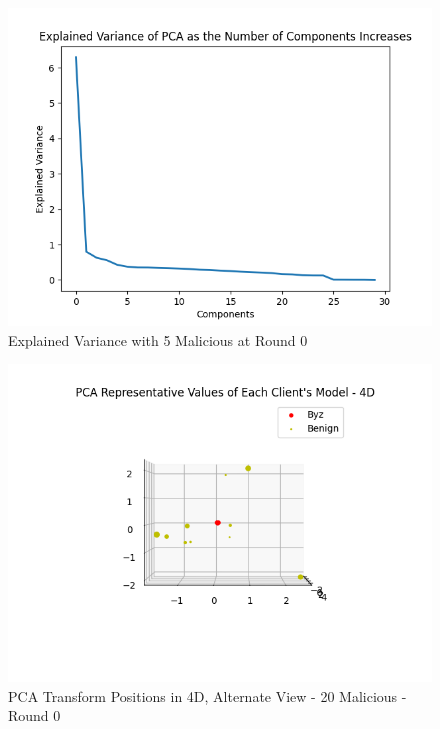 \begin{figure}[htbp]
	\centering
    \includegraphics[scale=0.5]{my_agg/graphs/5_r0.png}
	\caption{Explained Variance with 5 Malicious at Round 0}
	\label{fig:pca_50}
\end{figure}

\begin{figure}[htbp]
	\centering
    \includegraphics[scale=0.6]{my_agg/graphs/4d_diff.png}
	\caption{PCA Transform Positions in 4D, Alternate View - 20 Malicious - Round 0}
	\label{fig:4d_diff}
\end{figure}

